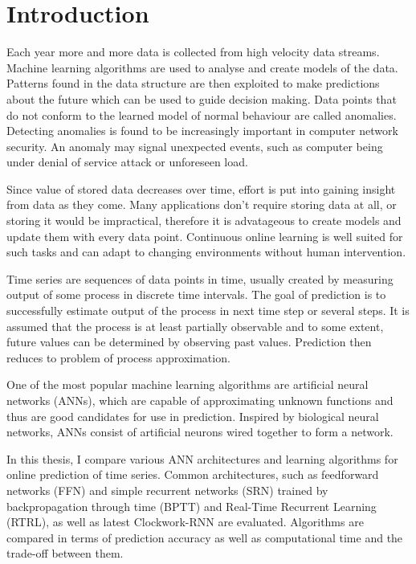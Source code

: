 \documentclass[12pt,oneside]{fithesis2}
\begin{document}
    \chapter{Introduction} %
Each year more and more data is collected from high velocity data streams. Machine learning algorithms are used to analyse and create models of the data. Patterns found in the data structure are then exploited to make predictions about the future which can be used to guide decision making. Data points that do not conform to the learned model of normal behaviour are called anomalies. Detecting anomalies is found to be increasingly important in computer network security. An anomaly may signal unexpected events, such as computer being under denial of service attack or unforeseen load.
\par %
Since value of stored data decreases over time, effort is put into gaining insight from data as they come. Many applications don't require storing data at all, or storing it would be impractical, therefore it is advatageous to create models and update them with every data point. Continuous online learning is well suited for such tasks and can adapt to changing environments without human intervention.
\par %
Time series are sequences of data points in time, usually created by measuring output of some process in discrete time intervals. The goal of prediction is to successfully estimate output of the process in next time step or several steps. It is assumed that the process is at least partially observable and to some extent, future values can be determined by observing past values. Prediction then reduces to problem of process approximation.
\par %
One of the most popular machine learning algorithms are artificial neural networks (ANNs), which are capable of approximating unknown functions and thus are good candidates for use in prediction. Inspired by biological neural networks, ANNs consist of artificial neurons wired together to form a network.
\par %
In this thesis, I compare various ANN architectures and learning algorithms for online prediction of time series. Common architectures, such as feedforward networks (FFN) and simple recurrent networks (SRN) trained by backpropagation through time (BPTT) and Real-Time Recurrent Learning (RTRL), as well as latest Clockwork-RNN are evaluated. Algorithms are compared in terms of prediction accuracy as well as computational time and the trade-off between them.
\end{document}
